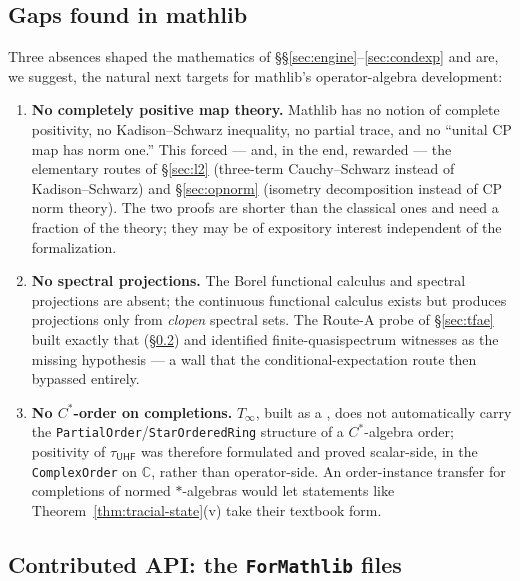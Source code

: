 \documentclass[11pt,a4paper]{amsart}
\theoremstyle{plain}
\theoremstyle{definition}
\newcommand{\lt}[1]{\texttt{\seqsplit{#1}}}
\newcommand{\Tinf}{T_\infty}
\newcommand{\tuhf}{\tau_{\mathsf{UHF}}}
\begin{document}
\subsection{Gaps found in mathlib}\label{sec:gaps}

Three absences shaped the mathematics of
\S\S\ref{sec:engine}--\ref{sec:condexp} and are, we suggest, the natural
next targets for mathlib's operator-algebra development:

\begin{enumerate}[label=\textbf{(G\arabic*)}, leftmargin=3em, itemsep=3pt]
\item \textbf{No completely positive map theory.} Mathlib has no notion
  of complete positivity, no Kadison--Schwarz inequality, no partial
  trace, and no ``unital CP map has norm one.'' This forced --- and, in
  the end, rewarded --- the elementary routes of \S\ref{sec:l2}
  (three-term Cauchy--Schwarz instead of Kadison--Schwarz) and
  \S\ref{sec:opnorm} (isometry decomposition instead of CP norm theory).
  The two proofs are shorter than the classical ones and need a fraction
  of the theory; they may be of expository interest independent of the
  formalization.
\item \textbf{No spectral projections.} The Borel functional calculus and
  spectral projections are absent; the continuous functional calculus
  exists but produces projections only from \emph{clopen} spectral sets.
  The Route-A probe of \S\ref{sec:tfae} built exactly that
  (\S\ref{sec:formathlib}) and identified finite-quasispectrum witnesses
  as the missing hypothesis --- a wall that the conditional-expectation
  route then bypassed entirely.
\item \textbf{No $C^*$-order on completions.} $\Tinf$, built as a
  \lt{UniformSpace.Completion}, does not automatically carry the
  \texttt{PartialOrder}/\texttt{StarOrderedRing} structure of a
  $C^*$-algebra order; positivity of $\tuhf$ was therefore formulated and
  proved scalar-side, in the \texttt{ComplexOrder} on $\mathbb{C}$,
  rather than operator-side. An order-instance transfer for completions
  of normed $*$-algebras would let statements like
  Theorem~\ref{thm:tracial-state}(v) take their textbook form.
\end{enumerate}

\subsection{Contributed API: the \texttt{ForMathlib} files}\label{sec:formathlib}
\end{document}
